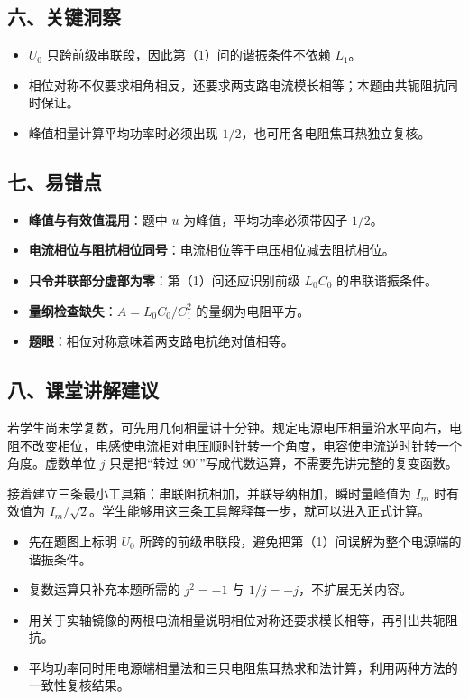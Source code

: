 \documentclass[12pt,a4paper,UTF8]{ctexart}
\newcommand{\tightlist}{\setlength{\itemsep}{0pt}\setlength{\parskip}{0pt}}
\begin{document}
\subsection{六、关键洞察}\label{ux516dux5173ux952eux6d1eux5bdf-4}

\begin{itemize}
\tightlist
\item
  \(U_0\) 只跨前级串联段，因此第（1）问的谐振条件不依赖 \(L_1\)。
\item
  相位对称不仅要求相角相反，还要求两支路电流模长相等；本题由共轭阻抗同时保证。
\item
  峰值相量计算平均功率时必须出现 \(1/2\)，也可用各电阻焦耳热独立复核。
\end{itemize}

\subsection{七、易错点}\label{ux4e03ux6613ux9519ux70b9-4}

\begin{itemize}
\tightlist
\item
  \textbf{峰值与有效值混用}：题中 \(u\) 为峰值，平均功率必须带因子
  \(1/2\)。
\item
  \textbf{电流相位与阻抗相位同号}：电流相位等于电压相位减去阻抗相位。
\item
  \textbf{只令并联部分虚部为零}：第（1）问还应识别前级 \(L_0C_0\)
  的串联谐振条件。
\item
  \textbf{量纲检查缺失}：\(A=L_0C_0/C_1^2\) 的量纲为电阻平方。
\item
  \textbf{题眼}：相位对称意味着两支路电抗绝对值相等。
\end{itemize}

\subsection{八、课堂讲解建议}\label{ux516bux8bfeux5802ux8bb2ux89e3ux5efaux8bae-4}

若学生尚未学复数，可先用几何相量讲十分钟。规定电源电压相量沿水平向右，电阻不改变相位，电感使电流相对电压顺时针转一个角度，电容使电流逆时针转一个角度。虚数单位
\(j\) 只是把``转过
\(90^\circ\)''写成代数运算，不需要先讲完整的复变函数。

接着建立三条最小工具箱：串联阻抗相加，并联导纳相加，瞬时量峰值为 \(I_m\)
时有效值为
\(I_m/\sqrt2\)。学生能够用这三条工具解释每一步，就可以进入正式计算。

\begin{itemize}
\tightlist
\item
  先在题图上标明 \(U_0\)
  所跨的前级串联段，避免把第（1）问误解为整个电源端的谐振条件。
\item
  复数运算只补充本题所需的 \(j^2=-1\) 与 \(1/j=-j\)，不扩展无关内容。
\item
  用关于实轴镜像的两根电流相量说明相位对称还要求模长相等，再引出共轭阻抗。
\item
  平均功率同时用电源端相量法和三只电阻焦耳热求和法计算，利用两种方法的一致性复核结果。
\end{itemize}
\end{document}

